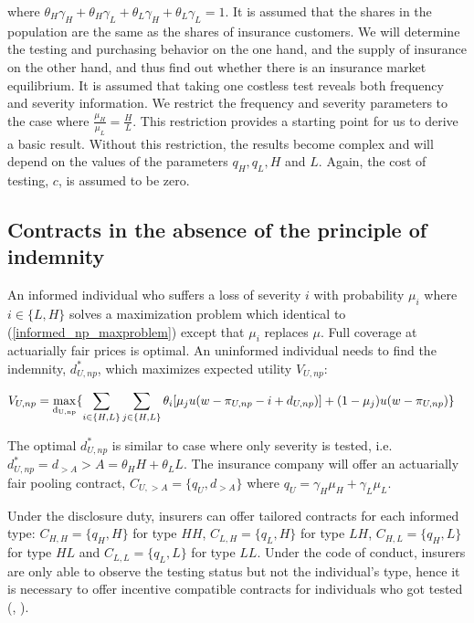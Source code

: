 \documentclass[natbib=false,preprint,12pt]{elsarticle}
\theoremstyle{plain}
\theoremstyle{definition}
\theoremstyle{plain}
\theoremstyle{TheoremNum}
\theoremstyle{CorollaryNum}
\theoremstyle{PropositionNum}
\theoremstyle{TheoremNum}
\begin{document}
where $\theta_H \gamma_H + \theta_H \gamma_L + \theta_L \gamma_H + \theta_L \gamma_L = 1$. It is assumed that the shares in the population are the same as the shares of insurance customers. We will determine the testing and purchasing behavior on the one hand, and the supply of insurance on the other hand, and thus find out whether there is an insurance market equilibrium. It is assumed that taking one costless test reveals both frequency and severity information. We restrict the frequency and severity parameters to the case where $\frac{\mu_H}{\mu_L} = \frac{H}{L}$. This restriction provides a starting point for us to derive a basic result. Without this restriction, the results become complex and will depend on the values of the parameters $q_H, q_L, H$ and $L$. Again, the cost of testing, $c$, is assumed to be zero. 

\subsection{Contracts in the absence of the principle of indemnity}

\setcounter{theorem}{5}
\renewcommand{\thetheorem}{\arabic{theorem}}

An informed individual who suffers a loss of severity $i$ with probability $\mu_i$ where $i \in \{L,H\}$ solves a maximization problem which identical to (\ref{informed_np_maxproblem}) except that $\mu_i$ replaces $\mu$. Full coverage at actuarially fair prices is optimal. An uninformed individual needs to find the indemnity, $d_{U,np}^*$, which maximizes expected utility $V_{U,np}$:

\begin{align}
    V_{U,np} & = \underset{\rm d_{U,np}}{\rm max } \{\sum_{i \in \{H,L\}} \sum_{j \in \{H,L\}}\theta_i[\mu_j u(w-\pi_{U,np}-i+d_{U,np})] +(1-\mu_j)u(w-\pi_{U,np}) \}
\label{uninformed_np_maxproblem_freqsev}
\end{align}

The optimal $d_{U,np}^*$ is similar to case where only severity is tested, i.e. $d_{U,np}^* = d_{>A} > A = \theta_H H + \theta_L L$. The insurance company will offer an actuarially fair pooling contract, $C_{U,>A} = \{q_U, d_{>A}\}$ where $q_U = \gamma_H \mu_H + \gamma_L \mu_L$.

Under the disclosure duty, insurers can offer tailored contracts for each informed type: $C_{H,H} = \{q_H, H\}$ for type $HH$, $C_{L,H} = \{q_L, H\}$ for type $LH$, $C_{H,L} = \{q_H, L\}$ for type $HL$ and $C_{L,L} = \{q_L, L\}$ for type $LL$. Under the code of conduct, insurers are only able to observe the testing status but not the individual's type, hence it is necessary to offer incentive compatible contracts for individuals who got tested (\citeauthor{rothschild1978equilibrium}, \citeyear{rothschild1978equilibrium}). 
\end{document}
